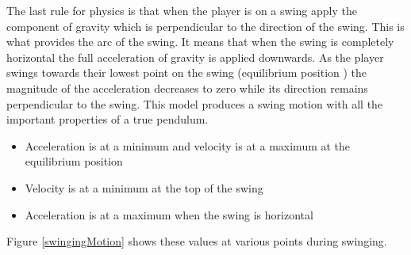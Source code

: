 \documentclass[]{report}
\begin{document}
			The last rule for physics is that when the player is on a swing apply the component of gravity which is perpendicular to the direction of the swing. This is what provides the arc of the swing. It means that when the swing is completely horizontal the full acceleration of gravity is applied downwards. As the player swings towards their lowest point on the swing (equilibrium position \cite{pendulumWiki}) the magnitude of the acceleration decreases to zero while its direction remains perpendicular to the swing. This model produces a swing motion with all the important properties of a true pendulum. 
			\begin{itemize}
				\item{Acceleration is at a minimum and velocity is at a maximum at the equilibrium position}
				\item{Velocity is at a minimum at the top of the swing}
				\item{Acceleration is at a maximum when the swing is horizontal}
			\end{itemize}
			Figure \ref{swingingMotion} shows these values at various points during swinging.
			
\end{document}
